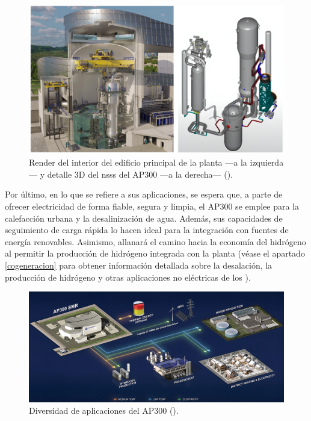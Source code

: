 \begin{figure}[h]
  \centering
  \includegraphics[width=\textwidth]{content/figures/ap300_inside_nsss.png}
  \caption{Render del interior del edificio principal de la planta ---a la izquierda--- y detalle 3D del \acrshort{nsss} del AP300 ---a la derecha--- (\cite{ap300_westinghouse}).}
  \label{fig:ap300_inside_nsss}
\end{figure}

 Por último, en lo que se refiere a sus aplicaciones, se espera que, a parte de ofrecer electricidad de forma fiable, segura y limpia, el AP300 se emplee para la calefacción urbana y la desalinización de agua. Además, sus capacidades de seguimiento de carga rápida lo hacen ideal para la integración con fuentes de energía renovables. Asimismo, allanará el camino hacia la economía del hidrógeno al permitir la producción de hidrógeno integrada con la planta (véase el apartado \ref{cogeneracion} para obtener información detallada sobre la desalación, la producción de hidrógeno y otras aplicaciones no eléctricas de los ).

 \begin{figure}[h]
  \centering
  \includegraphics[width=\textwidth]{content/figures/ap300_applications.jpeg}
  \caption{Diversidad de aplicaciones del AP300 (\cite{ap300_westinghouse}).}
  \label{fig:AP300_applications}
\end{figure}
